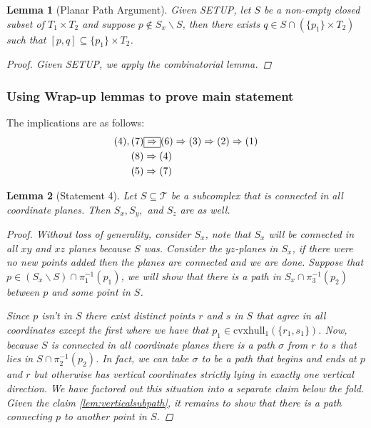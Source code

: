 \documentclass{article}
\theoremstyle{mystyle}
\newtheorem{lem}{Lemma}[section]
\theoremstyle{remark}
\begin{document}
\begin{lem}
    [Planar Path Argument]
    Given SETUP, let \(S\) be a non-empty closed subset of \(T_{1} \times T_{2}\) and suppose \(p \not\in S_{x}\smallsetminus S\), then there exists \(q \in S \cap \left( \{p_{1} \} \times T_{2} \right)\) such that \([p,q] \subseteq \{p_{1} \} \times T_{2}\).
    \begin{proof}
        Given SETUP, we apply the combinatorial lemma.
    \end{proof}
\end{lem}

\subsubsection{Using Wrap-up lemmas to prove main statement}
The implications are as follows:
\begin{alignat}{3}
    (4),(7) &\fbox{\(\Rightarrow\)}  (6) \Rightarrow (3) \Rightarrow (2)\Rightarrow (1)\\
    (8) &\Rightarrow (4)\\
    (5) &\Rightarrow (7)
\end{alignat}

\begin{lem}
    [Statement 4]
    Let \(S \subseteq \mathscr{T}\) be a subcomplex that is connected in all coordinate planes. Then \(S_{x}, S_{y},\) and \(S_{z}\) are as well. 
    \begin{proof}
        Without loss of generality, consider \(S_{ x}\), note that \(S_{x}\) will be connected in all \(xy\) and \(xz\) planes because \(S\) was. Consider the \(yz\)-planes in \(S_{x}\), if there were no new points added then the planes are connected and we are done. Suppose that \( p \in (S_{x} \smallsetminus S ) \cap \pi^{-1} _{1} (p_{1} )\), we will show that there is a path in \(S_{x} \cap \pi_{3}^{-1} (p_{2} )\) between \(p\) and some point in \(S\).
       
        Since \(p\) isn't in \(S\) there exist distinct points \(r\) and \(s\) in \(S \) that agree in all coordinates except the first where we have that \(p_{1} \in \text{cvxhull}_1 (\{r_{1} , s_{1}\})\). Now, because \(S\) is connected in all coordinate planes there is a path \(\sigma\) from \(r\) to \(s\) that lies in \(S \cap \pi_{2}^{-1} (p_{2})\). In fact, we can take \(\sigma\) to be a path that begins and ends at \(p\) and \(r\) but otherwise has vertical coordinates strictly lying in exactly one vertical direction. We have factored out this situation into a separate claim below the fold. Given the claim \ref{lem:verticalsubpath}, it remains to show that there is a path connecting \(p\) to another point in \(S\). 
    \end{proof}
\end{lem}
\end{document}
